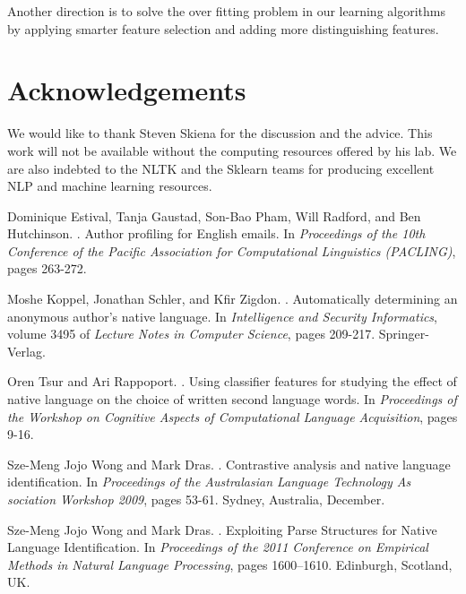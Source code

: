 \documentclass[11pt]{article}
\begin{document}
Another direction is to solve the over fitting problem in our learning algorithms by applying smarter feature selection and adding more distinguishing features.



\section*{Acknowledgements}
We would like to thank Steven Skiena for the discussion and the advice. This work will not be available without the computing resources offered by his lab. We are also indebted to the NLTK and the Sklearn teams for producing excellent NLP and machine learning resources.


\begin{thebibliography}{}

Dominique Estival, Tanja Gaustad, Son-Bao Pham, Will Radford, and Ben Hutchinson.
.
\newblock Author profiling for English emails. In {\em Proceedings of the 10th Conference of the Pacific Association for Computational Linguistics (PACLING)}, pages 263-272.

Moshe Koppel, Jonathan Schler, and Kfir Zigdon.
.
\newblock Automatically determining an anonymous author’s native language. In {\em Intelligence and Security Informatics}, volume 3495 of {\em Lecture Notes in Computer Science}, pages 209-217.
\newblock Springer-Verlag.

Oren Tsur and Ari Rappoport.
.
\newblock Using classifier features for studying the effect of native language on the choice of written second language words. In {\em Proceedings of the Workshop on Cognitive Aspects of Computational Language Acquisition}, pages 9-16.

Sze-Meng Jojo Wong and Mark Dras.
.
\newblock Contrastive analysis and native language identification. In {\em Proceedings of the Australasian Language Technology As sociation Workshop 2009}, pages 53-61.
\newblock Sydney, Australia, December.

Sze-Meng Jojo Wong and Mark Dras.
.
\newblock Exploiting Parse Structures for Native Language Identification. In {\em Proceedings of the 2011 Conference on Empirical Methods in Natural Language Processing}, pages 1600–1610.
\newblock Edinburgh, Scotland, UK.

\end{thebibliography}
\end{document}
